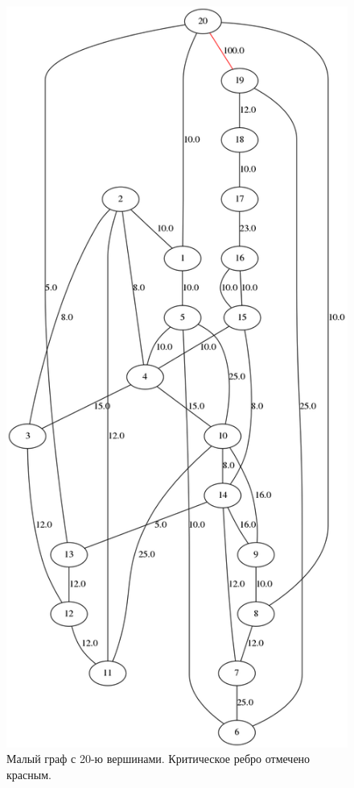 \documentclass[12pt]{article}
\begin{document}
\begin{figure}[h]
    \centering
    \includegraphics[scale=0.3]{small.png}
    \caption{Малый граф с 20-ю вершинами. Критическое ребро отмечено красным.}
    \label{fig:small}
\end{figure}
\end{document}
